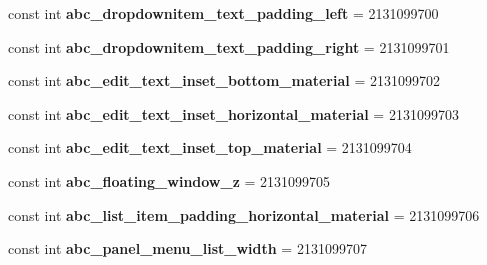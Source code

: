 \begin{DoxyCompactItemize}
const int {\bfseries abc\+\_\+dropdownitem\+\_\+text\+\_\+padding\+\_\+left} = 2131099700
\item 
\mbox{\label{class_sample_app_1_1_droid_1_1_resource_1_1_dimension_ac8d31faa277282c0a618f05870cc9472}} 
const int {\bfseries abc\+\_\+dropdownitem\+\_\+text\+\_\+padding\+\_\+right} = 2131099701
\item 
\mbox{\label{class_sample_app_1_1_droid_1_1_resource_1_1_dimension_aaf5c77a9d265c344a4f3b68d688189dc}} 
const int {\bfseries abc\+\_\+edit\+\_\+text\+\_\+inset\+\_\+bottom\+\_\+material} = 2131099702
\item 
\mbox{\label{class_sample_app_1_1_droid_1_1_resource_1_1_dimension_a1d4004b28a9ed3063c6ba2a2be1e460c}} 
const int {\bfseries abc\+\_\+edit\+\_\+text\+\_\+inset\+\_\+horizontal\+\_\+material} = 2131099703
\item 
\mbox{\label{class_sample_app_1_1_droid_1_1_resource_1_1_dimension_aeb82ffa45b94b5822a26afaf37053762}} 
const int {\bfseries abc\+\_\+edit\+\_\+text\+\_\+inset\+\_\+top\+\_\+material} = 2131099704
\item 
\mbox{\label{class_sample_app_1_1_droid_1_1_resource_1_1_dimension_afeb935561cd48e5f4fe4492e28df32f3}} 
const int {\bfseries abc\+\_\+floating\+\_\+window\+\_\+z} = 2131099705
\item 
\mbox{\label{class_sample_app_1_1_droid_1_1_resource_1_1_dimension_a36cc10c62a68cc450991dc9c9bea5583}} 
const int {\bfseries abc\+\_\+list\+\_\+item\+\_\+padding\+\_\+horizontal\+\_\+material} = 2131099706
\item 
\mbox{\label{class_sample_app_1_1_droid_1_1_resource_1_1_dimension_a4c8f7ab0f52598034d8e90cdd03fd174}} 
const int {\bfseries abc\+\_\+panel\+\_\+menu\+\_\+list\+\_\+width} = 2131099707
\item 
\mbox{\label{class_sample_app_1_1_droid_1_1_resource_1_1_dimension_aa7f544d7c7108b31ef3d488f5542553c}} 

\end{DoxyCompactItemize}
